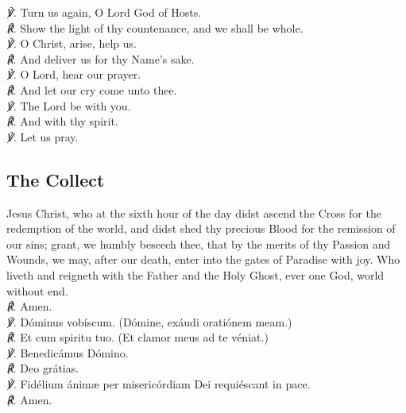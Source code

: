 \vspace{1ex}
\textit{\scshape ℣.} Turn us again, O Lord God of Hosts.\\
\textit{\scshape ℟.} Show the light of thy countenance, and we shall be whole.\\
\textit{\scshape ℣.} O Christ, arise, help us.\\
\textit{\scshape ℟.} And deliver us for thy Name's sake.\\
\textit{\scshape ℣.} O Lord, hear our prayer.\\
\textit{\scshape ℟.} And let our cry come unto thee.\\
\textit{\scshape ℣.} The Lord be with you.\\
\textit{\scshape ℟.} And with thy spirit.\\
\textit{\scshape ℣.} Let us pray.
\subsection{The Collect}
 Jesus Christ, who at the sixth hour of the day didst ascend the Cross for the redemption of the world, and didst shed thy precious Blood for the remission of our sins; grant, we humbly beseech thee, that by the merits of thy Passion and Wounds, we may, after our death, enter into the gates of Paradise with joy. Who liveth and reigneth with the Father and the Holy Ghost, ever one God, world without end.\\
\textit{\scshape ℟.} Amen.\\
{
	\textit{\scshape ℣.} Dóminus vobíscum. (Dómine, exáudi oratiónem meam.)\\
	\textit{\scshape ℟.} Et cum spiritu tuo. (Et clamor meus ad te véniat.)\\
	\textit{\scshape ℣.} Benedicámus Dómino.\\
	\textit{\scshape ℟.} Deo grátias.\\
	\textit{\scshape ℣.} Fidélium ánim{\ae} {} per misericórdiam Dei requiéscant in pace.\\
	\textit{\scshape ℟.} Amen.
}